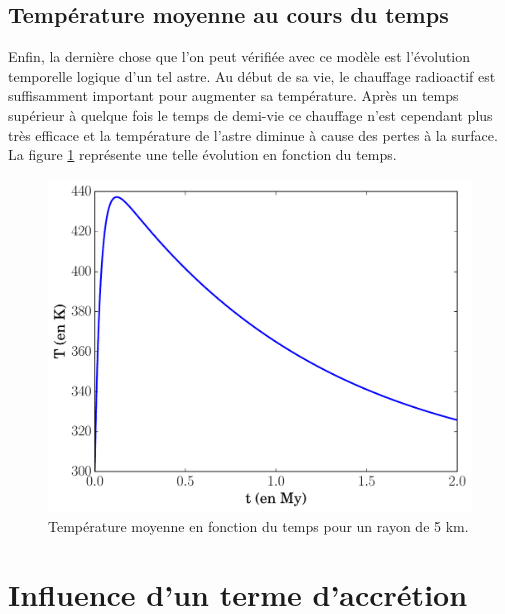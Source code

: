 \documentclass[10pt,a4paper]{article}
\numberwithin{equation}{section}
\begin{document}
\subsection{Température moyenne au cours du temps}
Enfin, la dernière chose que l'on peut vérifiée avec ce modèle est l'évolution temporelle logique d'un tel astre. Au début de sa vie, le chauffage radioactif est suffisamment important pour augmenter sa température. Après un temps supérieur à quelque fois le temps de demi-vie ce chauffage n'est cependant plus très efficace et la température de l'astre diminue à cause des pertes à la surface. La figure \ref{tempMoy} représente une telle évolution en fonction du temps.
\begin{figure}[h]
    \centering	    
	\includegraphics[scale=0.43]{figures/tempMoy.pdf}
    \caption{Température moyenne en fonction du temps pour un rayon de 5 km.}
    	\label{tempMoy} 
\end{figure}

\newpage
\section{Influence d'un terme d'accrétion}
\end{document}
